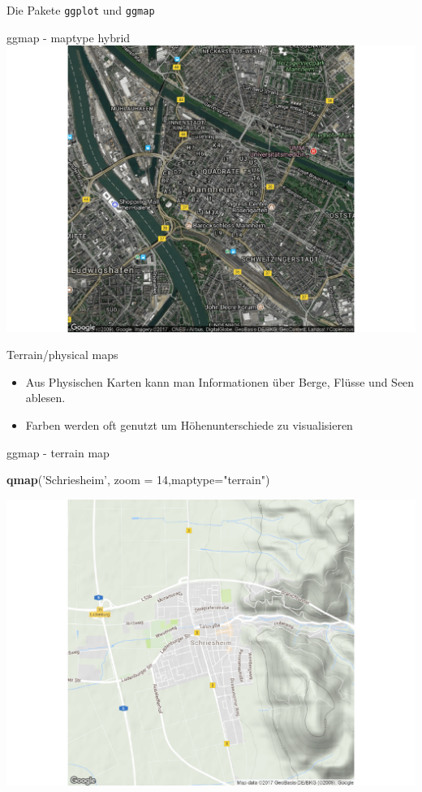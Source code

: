 \documentclass[ignorenonframetext,]{beamer}
\newenvironment{Shaded}{}{}
\newcommand{\KeywordTok}[1]{\textcolor[rgb]{0.00,0.44,0.13}{\textbf{{#1}}}}
\newcommand{\DataTypeTok}[1]{\textcolor[rgb]{0.56,0.13,0.00}{{#1}}}
\newcommand{\DecValTok}[1]{\textcolor[rgb]{0.25,0.63,0.44}{{#1}}}
\newcommand{\StringTok}[1]{\textcolor[rgb]{0.25,0.44,0.63}{{#1}}}
\newcommand{\NormalTok}[1]{{#1}}
\begin{document}
\begin{frame}[fragile]{Die Pakete \texttt{ggplot} und \texttt{ggmap}}
\begin{block}{ggmap - maptype hybrid}
\includegraphics{R_intern_files/figure-beamer/unnamed-chunk-264-1.pdf}

\end{block}

\begin{block}{Terrain/physical maps}

\begin{itemize}
\item
  Aus Physischen Karten kann man Informationen über Berge, Flüsse und
  Seen ablesen.
\item
  Farben werden oft genutzt um Höhenunterschiede zu visualisieren
\end{itemize}

\end{block}

\begin{block}{ggmap - terrain map}

\begin{Shaded}
\begin{Highlighting}[]
\KeywordTok{qmap}\NormalTok{(}\StringTok{'Schriesheim'}\NormalTok{, }\DataTypeTok{zoom =} \DecValTok{14}\NormalTok{,}\DataTypeTok{maptype=}\StringTok{"terrain"}\NormalTok{)}
\end{Highlighting}
\end{Shaded}

\includegraphics{R_intern_files/figure-beamer/unnamed-chunk-265-1.pdf}


\end{block}
\end{frame}
\end{document}
